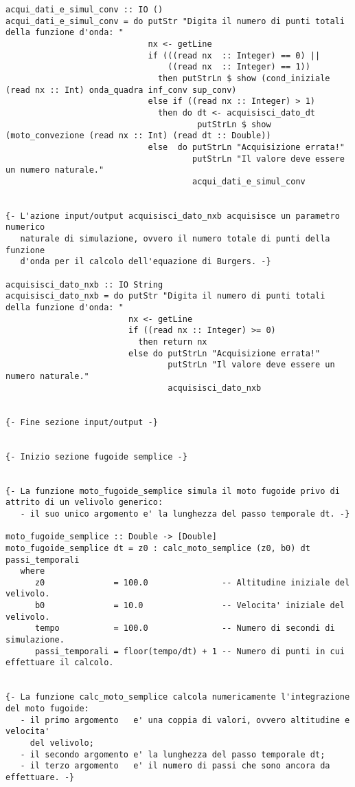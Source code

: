 \begin{verbatim}
acqui_dati_e_simul_conv :: IO ()
acqui_dati_e_simul_conv = do putStr "Digita il numero di punti totali della funzione d'onda: "
                             nx <- getLine
                             if (((read nx  :: Integer) == 0) ||
                                 ((read nx  :: Integer) == 1)) 
                               then putStrLn $ show (cond_iniziale (read nx :: Int) onda_quadra inf_conv sup_conv)
                             else if ((read nx :: Integer) > 1)
                               then do dt <- acquisisci_dato_dt
                                       putStrLn $ show (moto_convezione (read nx :: Int) (read dt :: Double))
                             else  do putStrLn "Acquisizione errata!"
                                      putStrLn "Il valore deve essere un numero naturale."
                                      acqui_dati_e_simul_conv


{- L'azione input/output acquisisci_dato_nxb acquisisce un parametro numerico
   naturale di simulazione, ovvero il numero totale di punti della funzione
   d'onda per il calcolo dell'equazione di Burgers. -}

acquisisci_dato_nxb :: IO String
acquisisci_dato_nxb = do putStr "Digita il numero di punti totali della funzione d'onda: "
                         nx <- getLine
                         if ((read nx :: Integer) >= 0)
                           then return nx
                         else do putStrLn "Acquisizione errata!"
                                 putStrLn "Il valore deve essere un numero naturale."
                                 acquisisci_dato_nxb 


{- Fine sezione input/output -}


{- Inizio sezione fugoide semplice -}


{- La funzione moto_fugoide_semplice simula il moto fugoide privo di attrito di un velivolo generico:
   - il suo unico argomento e' la lunghezza del passo temporale dt. -}

moto_fugoide_semplice :: Double -> [Double]
moto_fugoide_semplice dt = z0 : calc_moto_semplice (z0, b0) dt passi_temporali
   where
      z0              = 100.0               -- Altitudine iniziale del velivolo.
      b0              = 10.0                -- Velocita' iniziale del velivolo.
      tempo           = 100.0               -- Numero di secondi di simulazione.
      passi_temporali = floor(tempo/dt) + 1 -- Numero di punti in cui effettuare il calcolo.


{- La funzione calc_moto_semplice calcola numericamente l'integrazione del moto fugoide:
   - il primo argomento   e' una coppia di valori, ovvero altitudine e velocita' 
     del velivolo;
   - il secondo argomento e' la lunghezza del passo temporale dt;
   - il terzo argomento   e' il numero di passi che sono ancora da effettuare. -}


\end{verbatim}
